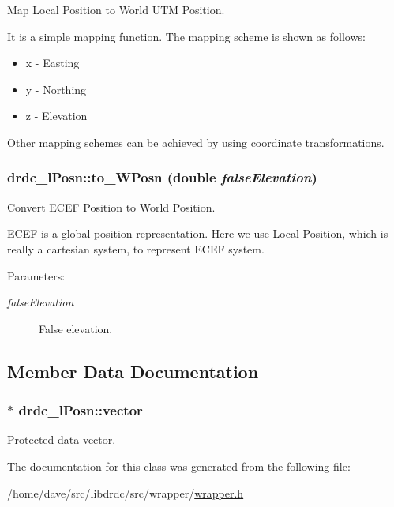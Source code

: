 Map Local Position to World UTM Position. 

It is a simple mapping function. The mapping scheme is shown as follows:\begin{itemize}
\item x - Easting\item y - Northing\item z - Elevation\end{itemize}


Other mapping schemes can be achieved by using coordinate transformations. \hypertarget{classdrdc__lPosn_6abd4aad19a2f3323e36ce16800a5d3e}{
\subsubsection[to\_\-WPosn]{ drdc\_\-lPosn::to\_\-WPosn (double {\em falseElevation})}}
\label{classdrdc__lPosn_6abd4aad19a2f3323e36ce16800a5d3e}


Convert ECEF Position to World Position. 

ECEF is a global position representation. Here we use Local Position, which is really a cartesian system, to represent ECEF system.

\begin{Desc}
\item[Parameters:]
\begin{description}
\item[{\em falseElevation}]False elevation. \end{description}
\end{Desc}


\subsection{Member Data Documentation}
\hypertarget{classdrdc__lPosn_91f12f937fa99f51bc221c237f47b63f}{
\subsubsection[vector]{$\ast$ {\bf drdc\_\-lPosn::vector}}}
\label{classdrdc__lPosn_91f12f937fa99f51bc221c237f47b63f}


Protected data vector. 



The documentation for this class was generated from the following file:\begin{CompactItemize}
\item 
/home/dave/src/libdrdc/src/wrapper/\hyperlink{wrapper_8h}{wrapper.h}\end{CompactItemize}
